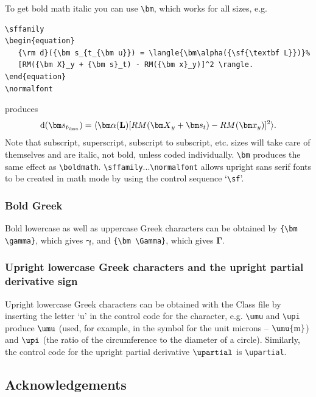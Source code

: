 \documentclass[]{cJEN2e}
\begin{document}
To get bold math italic you can use \verb"\bm", which works for
all sizes, e.g.
%
\begin{verbatim}
\sffamily
\begin{equation}
   {\rm d}({\bm s_{t_{\bm u}}) = \langle{\bm\alpha({\sf{\textbf L}})}%
   [RM({\bm X}_y + {\bm s}_t) - RM({\bm x}_y)]^2 \rangle.
\end{equation}
\normalfont
\end{verbatim}
%
produces\sffamily
\begin{equation}
   {\rm d}({\bm s_{t_{\bm u}}}) = \langle {\bm\alpha({\sf{\textbf L}})}[RM({\bm X}_y
   + {\bm s}_t) - RM({\bm x}_y)]^2 \rangle.
\end{equation}\normalfont
Note that subscript, superscript, subscript to subscript, etc.
sizes will take care of themselves and are italic, not bold,
unless coded individually. \verb"\bm" produces the same effect as
\verb"\boldmath". \verb"\sffamily"...\verb"\normalfont" allows
upright sans serif fonts to be created in math mode by using the
control sequence `\verb"\sf"'.



\subsubsection{Bold Greek}\label{boldgreek}

Bold lowercase as well as uppercase Greek characters can be
obtained by \verb"{\bm \gamma}", which gives ${\bm \gamma}$, and
\verb"{\bm \Gamma}", which gives ${\bm \Gamma}$.


\subsubsection{Upright lowercase Greek characters and the upright partial derivative sign}\label{upgreek}

Upright lowercase Greek characters can be obtained with the Class file by inserting the letter `u' in the control
code for the character, e.g. \verb"\umu" and \verb"\upi" produce $\umu$ (used, for example, in the symbol for the
unit microns -- $\umu{\rm m}$) and $\upi$ (the ratio of the circumference to the diameter of a circle). Similarly,
the control code for the upright partial derivative $\upartial$ is \verb"\upartial".

\subsection{Acknowledgements}
\end{document}
